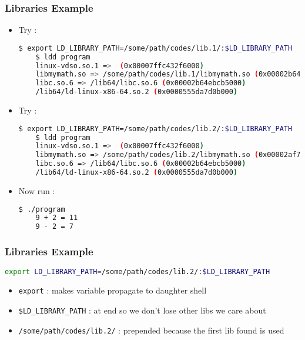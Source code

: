 \documentclass{beamer}
\newcommand{\code}[1]{\colorbox{codegray}{\texttt{#1}}}
\begin{document}
\begin{frame}[fragile]
\frametitle{Libraries Example}
\begin{itemize}
    \item Try : 
    \begingroup
    \tiny
    \begin{lstlisting}[backgroundcolor = \color{codegray}, language = Bash, showstringspaces=false]
    $ export LD_LIBRARY_PATH=/some/path/codes/lib.1/:$LD_LIBRARY_PATH
    $ ldd program
	linux-vdso.so.1 =>  (0x00007ffc432f6000)
	libmymath.so => /some/path/codes/lib.1/libmymath.so (0x00002b64eba91000)
	libc.so.6 => /lib64/libc.so.6 (0x00002b64ebcb5000)
	/lib64/ld-linux-x86-64.so.2 (0x0000555da7d0b000)
    \end{lstlisting}
    \endgroup

    \pause
    \item Try : 
    \begingroup
    \tiny
    \begin{lstlisting}[backgroundcolor = \color{codegray}, language = Bash, showstringspaces=false]
    $ export LD_LIBRARY_PATH=/some/path/codes/lib.2/:$LD_LIBRARY_PATH
    $ ldd program
	linux-vdso.so.1 =>  (0x00007ffc432f6000)
	libmymath.so => /some/path/codes/lib.2/libmymath.so (0x00002af711fe1000)
	libc.so.6 => /lib64/libc.so.6 (0x00002b64ebcb5000)
	/lib64/ld-linux-x86-64.so.2 (0x0000555da7d0b000)
    \end{lstlisting}
    \endgroup

    \pause
    \item Now run : 
    \begingroup
    \tiny
    \begin{lstlisting}[backgroundcolor = \color{codegray}, language = Bash, showstringspaces=false]
    $ ./program
    9 + 2 = 11
    9 - 2 = 7
    \end{lstlisting}
    \endgroup
\end{itemize}
\end{frame}


\begin{frame}[fragile]
\frametitle{Libraries Example}
    \begingroup
    \scriptsize
    \begin{lstlisting}[backgroundcolor = \color{codegray}, language = Bash, showstringspaces=false]
    export LD_LIBRARY_PATH=/some/path/codes/lib.2/:$LD_LIBRARY_PATH
    \end{lstlisting}
    \endgroup

    \begin{itemize}
        \item \code{\scriptsize export} : makes variable propagate to daughter shell
        \pause
        \bigskip
        \item \code{\scriptsize \$LD\_LIBRARY\_PATH} : at end so we don't lose other libs we care about
        \pause
        \bigskip
        \item \code{\scriptsize /some/path/codes/lib.2/} : prepended because the first lib found is used
    \end{itemize}
\end{frame}
\end{document}
